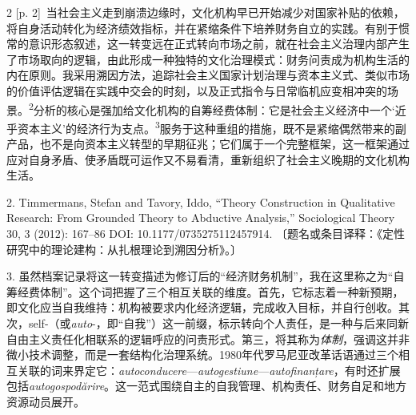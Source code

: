 \documentclass[10pt,a4paper]{article}
\begin{document}
\begin{paracol}{2}
{\scriptsize\color{gray} [p. 2]}\ 当社会主义走到崩溃边缘时，文化机构早已开始减少对国家补贴的依赖，将自身活动转化为经济绩效指标，并在紧缩条件下培养财务自立的实践。有别于惯常的意识形态叙述，这一转变远在正式转向市场之前，就在社会主义治理内部产生了市场取向的逻辑，由此形成一种独特的文化治理模式：财务问责成为机构生活的内在原则。我采用溯因方法，追踪社会主义国家计划治理与资本主义式、类似市场的价值评估逻辑在实践中交会的时刻，以及正式指令与日常临机应变相冲突的场\mbox{景。\textsuperscript{2}}分析的核心是强加给文化机构的自筹经费体制：它是社会主义经济中一个‘近乎资本主义’的经济行为支\mbox{点。\textsuperscript{3}}服务于这种重组的措施，既不是紧缩偶然带来的副产品，也不是向资本主义转型的早期征兆；它们属于一个完整框架，这一框架通过应对自身矛盾、使矛盾既可运作又不易看清，重新组织了社会主义晚期的文化机构生活。\par{\small 2. Timmermans, Stefan and Tavory, Iddo, “Theory Construction in Qualitative Research: From Grounded Theory to Abductive Analysis,” Sociological Theory 30, 3 (2012): 167–86 DOI: 10.1177/0735275112457914. 〔题名或条目译释：《定性研究中的理论建构：从扎根理论到溯因分析》。〕\par}{\small 3. 虽然档案记录将这一转变描述为修订后的“经济财务机制”，我在这里称之为“自筹经费体制”。这个词把握了三个相互关联的维度。首先，它标志着一种新预期，即文化应当自我维持：机构被要求内化经济逻辑，完成收入目标，并自行创收。其次，self-（或\textit{auto}-，即“自我”）这一前缀，标示转向个人责任，是一种与后来同新自由主义责任化相联系的逻辑呼应的问责形式。第三，将其称为\textit{体制}，强调这并非微小技术调整，而是一套结构化治理系统。1980年代罗马尼亚改革话语通过三个相互关联的词来界定它：\textit{autoconducere}—\textit{autogestiune}—\textit{autofinanțare}，有时还扩展包括\textit{autogospodărire}。这一范式围绕自主的自我管理、机构责任、财务自足和地方资源动员展开。\par}
\switchcolumn

\end{paracol}
\end{document}
